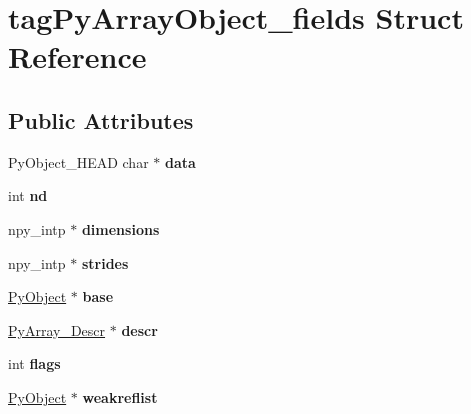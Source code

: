 \hypertarget{structtagPyArrayObject__fields}{}\section{tag\+Py\+Array\+Object\+\_\+fields Struct Reference}
\label{structtagPyArrayObject__fields}
\subsection*{Public Attributes}
\begin{DoxyCompactItemize}
\item 
Py\+Object\+\_\+\+H\+E\+AD char $\ast$ {\bfseries data}\hypertarget{structtagPyArrayObject__fields_a185b5d831bdc75b7f06771b16f83c421}{}\label{structtagPyArrayObject__fields_a185b5d831bdc75b7f06771b16f83c421}

\item 
int {\bfseries nd}\hypertarget{structtagPyArrayObject__fields_ad0b4e7b917da014b50323a873df4fbec}{}\label{structtagPyArrayObject__fields_ad0b4e7b917da014b50323a873df4fbec}

\item 
npy\+\_\+intp $\ast$ {\bfseries dimensions}\hypertarget{structtagPyArrayObject__fields_a0f16d4c6e6756eb3c173641f154a9d34}{}\label{structtagPyArrayObject__fields_a0f16d4c6e6756eb3c173641f154a9d34}

\item 
npy\+\_\+intp $\ast$ {\bfseries strides}\hypertarget{structtagPyArrayObject__fields_ac6a0302cf61da1cceda077b6556d94a8}{}\label{structtagPyArrayObject__fields_ac6a0302cf61da1cceda077b6556d94a8}

\item 
\hyperlink{struct__object}{Py\+Object} $\ast$ {\bfseries base}\hypertarget{structtagPyArrayObject__fields_a9546eb62fe289ad3a282a34eb31e202b}{}\label{structtagPyArrayObject__fields_a9546eb62fe289ad3a282a34eb31e202b}

\item 
\hyperlink{struct__PyArray__Descr}{Py\+Array\+\_\+\+Descr} $\ast$ {\bfseries descr}\hypertarget{structtagPyArrayObject__fields_a1e2f1d81faccfbd5fe4f7dfb09c03a9d}{}\label{structtagPyArrayObject__fields_a1e2f1d81faccfbd5fe4f7dfb09c03a9d}

\item 
int {\bfseries flags}\hypertarget{structtagPyArrayObject__fields_a43821c110979d0cf3e04cff3761f2f63}{}\label{structtagPyArrayObject__fields_a43821c110979d0cf3e04cff3761f2f63}

\item 
\hyperlink{struct__object}{Py\+Object} $\ast$ {\bfseries weakreflist}\hypertarget{structtagPyArrayObject__fields_a4d6838fdb4f3f5b17dbfe04578bdff1e}{}\label{structtagPyArrayObject__fields_a4d6838fdb4f3f5b17dbfe04578bdff1e}

\end{DoxyCompactItemize}


